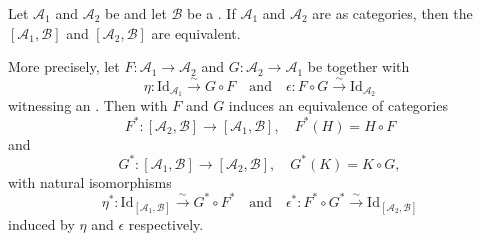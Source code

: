 \begin{lemma} \label{lemma:equivalence_of_functor_categories_under_equivalent_source_categories}
Let $\mathcal{A}_1$ and $\mathcal{A}_2$ be  and let $\mathcal{B}$ be a . If $\mathcal{A}_1$ and $\mathcal{A}_2$ are  as categories, then the  $[\mathcal{A}_1, \mathcal{B}]$ and $[\mathcal{A}_2, \mathcal{B}]$ are equivalent.

More precisely, let $F: \mathcal{A}_1 \to \mathcal{A}_2$ and $G: \mathcal{A}_2 \to \mathcal{A}_1$ be  together with 
$$\eta: \mathrm{Id}_{\mathcal{A}_1} \xrightarrow{\sim} G \circ F \quad \text{and} \quad \epsilon: F \circ G \xrightarrow{\sim} \mathrm{Id}_{\mathcal{A}_2}$$
witnessing an . Then  with $F$ and $G$ induces an equivalence of categories
$$F^*: [\mathcal{A}_2, \mathcal{B}] \to [\mathcal{A}_1, \mathcal{B}], \quad F^*(H) = H \circ F$$
and
$$G^*: [\mathcal{A}_1, \mathcal{B}] \to [\mathcal{A}_2, \mathcal{B}], \quad G^*(K) = K \circ G,$$
with natural isomorphisms
$$\eta^*: \mathrm{Id}_{[\mathcal{A}_1, \mathcal{B}]} \xrightarrow{\sim} G^* \circ F^* \quad \text{and} \quad \epsilon^*: F^* \circ G^* \xrightarrow{\sim} \mathrm{Id}_{[\mathcal{A}_2, \mathcal{B}]}$$
induced by $\eta$ and $\epsilon$ respectively.
\end{lemma}